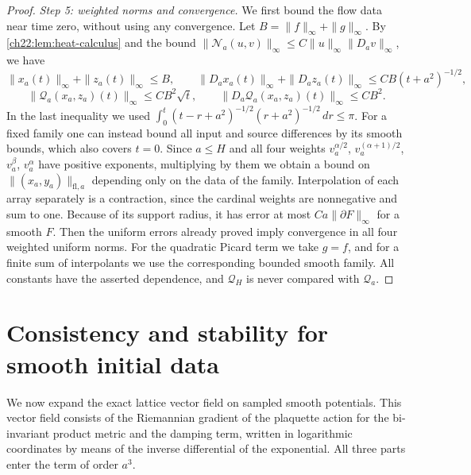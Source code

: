 \begin{proof}
\emph{Step 5: weighted norms and convergence.} We first bound the flow data near time zero, without using any convergence. Let $B=\|f\|_\infty+\|g\|_\infty$. By \cref{ch22:lem:heat-calculus} and the bound $\|\mathcal N_a(u,v)\|_\infty\le C\|u\|_\infty\|D_av\|_\infty$, we have
\[
 \|x_a(t)\|_\infty+\|z_a(t)\|_\infty\le B,\qquad
 \|D_ax_a(t)\|_\infty+\|D_az_a(t)\|_\infty\le CB(t+a^2)^{-1/2},
\]
\[
 \|\mathcal Q_a(x_a,z_a)(t)\|_\infty\le CB^2\sqrt t,\qquad
 \|D_a\mathcal Q_a(x_a,z_a)(t)\|_\infty\le CB^2 .
\]
In the last inequality we used $\int_0^t(t-r+a^2)^{-1/2}(r+a^2)^{-1/2}\,dr\le\pi$. For a fixed family one can instead bound all input and source differences by its smooth bounds, which also covers $t=0$. Since $a\le H$ and all four weights $v_a^{\alpha/2}$, $v_a^{(\alpha+1)/2}$, $v_a^{\beta}$, $v_a^{\alpha}$ have positive exponents, multiplying by them we obtain a bound on $\|(x_a,y_a)\|_{\mathrm{fl},a}$ depending only on the data of the family. Interpolation of each array separately is a contraction, since the cardinal weights are nonnegative and sum to one. Because of its support radius, it has error at most $Ca\|\partial F\|_\infty$ for a smooth $F$. Then the uniform errors already proved imply convergence in all four weighted uniform norms. For the quadratic Picard term we take $g=f$, and for a finite sum of interpolants we use the corresponding bounded smooth family. All constants have the asserted dependence, and $\mathcal Q_H$ is never compared with $\mathcal Q_a$.
\end{proof}

\section{Consistency and stability for smooth initial data}\label{ch22:sec:smooth-data}

We now expand the exact lattice vector field on sampled smooth potentials. This vector field consists of the Riemannian gradient of the plaquette action for the bi-invariant product metric and the damping term, written in logarithmic coordinates by means of the inverse differential of the exponential. All three parts enter the term of order $a^3$.


